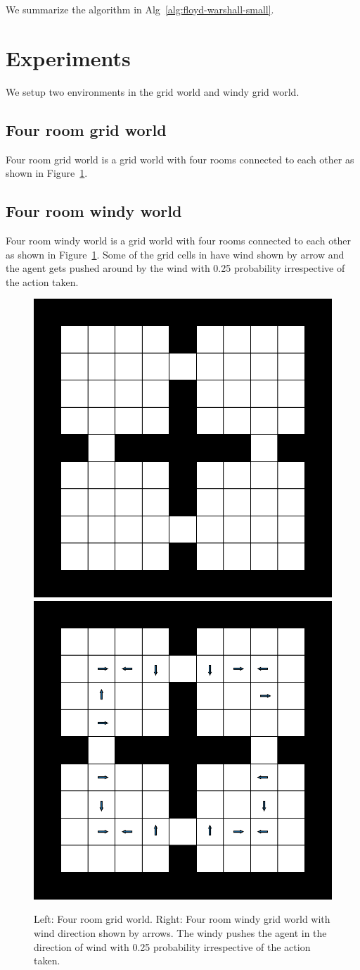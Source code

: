 \documentclass[letterpaper]{article} %
\begin{document}
We summarize the algorithm in Alg~\ref{alg:floyd-warshall-small}.

\section{Experiments}
We setup two environments in the grid world and windy grid world.
\subsection{Four room grid world}

Four room grid world is a grid world with four rooms connected to each other as shown in Figure~\ref{fig:four-room-grid-world}.

\subsection{Four room windy world}

Four room windy world is a grid world with four rooms connected to each other as shown in Figure~\ref{fig:four-room-grid-world}.
Some of the grid cells in have wind shown by arrow and the agent gets pushed around by
the wind with 0.25 probability irrespective of the action taken.


%
\begin{figure}%
\includegraphics[width=0.48\columnwidth]{media/4-room-grid-world.pdf}
\hfill
\includegraphics[width=0.48\columnwidth]{media/4-room-windy-world.pdf}%
\caption{Left: Four room grid world. Right: Four room windy grid world with wind direction shown by arrows. The windy pushes the agent in the direction of wind with 0.25 probability irrespective of the action taken.}
\label{fig:four-room-grid-world}%
\end{figure}%
%
\end{document}
